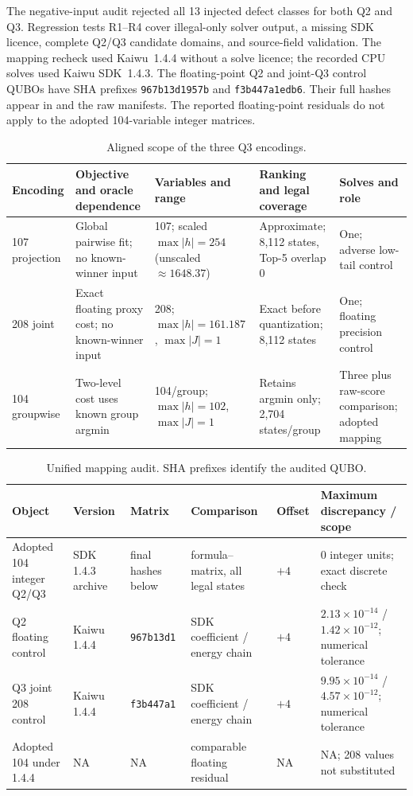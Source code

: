 The negative-input audit rejected all 13 injected defect classes for
both Q2 and Q3.  Regression tests R1--R4 cover illegal-only solver output,
a missing SDK licence, complete Q2/Q3 candidate domains, and source-field
validation.  The mapping recheck used Kaiwu~1.4.4 without a solve licence;
the recorded CPU solves used Kaiwu SDK~1.4.3.  The floating-point Q2 and
joint-Q3 control QUBOs have SHA prefixes
\texttt{967b13d1957b} and \texttt{f3b447a1edb6}.  Their full hashes appear
in  and the raw manifests.  The
reported floating-point residuals do not apply to the adopted
104-variable integer matrices.

\begin{table}[!htbp]
\centering
\caption{Aligned scope of the three Q3 encodings.}
\label{tab:q3-encoding-comparison}
\scriptsize
\begin{tabularx}{\textwidth}{@{}lXXXX@{}}
\toprule
Encoding & Objective and oracle dependence & Variables and range & Ranking and legal coverage & Solves and role \\
\midrule
107 projection & Global pairwise fit; no known-winner input & 107; scaled $\max|h|=254$ (unscaled $\approx1648.37$) & Approximate; 8,112 states, Top-5 overlap 0 & One; adverse low-tail control \\
208 joint & Exact floating proxy cost; no known-winner input & 208; $\max|h|=161.187$, $\max|J|=1$ & Exact before quantization; 8,112 states & One; floating precision control \\
104 groupwise & Two-level cost uses known group argmin & 104/group; $\max|h|=102$, $\max|J|=1$ & Retains argmin only; 2,704 states/group & Three plus raw-score comparison; adopted mapping \\
\bottomrule
\end{tabularx}
\end{table}

\begin{table}[!htbp]
\centering
\caption{Unified mapping audit.  SHA prefixes identify the audited QUBO.}
\label{tab:mapping-audit}
\scriptsize
\begin{tabularx}{\textwidth}{@{}lXXXXX@{}}
\toprule
Object & Version & Matrix & Comparison & Offset & Maximum discrepancy / scope \\
\midrule
Adopted 104 integer Q2/Q3 & SDK 1.4.3 archive & final hashes below & formula--matrix, all legal states & $+4$ & 0 integer units; exact discrete check \\
Q2 floating control & Kaiwu 1.4.4 & \texttt{967b13d1} & SDK coefficient / energy chain & $+4$ & $2.13\times10^{-14}$ / $1.42\times10^{-12}$; numerical tolerance \\
Q3 joint 208 control & Kaiwu 1.4.4 & \texttt{f3b447a1} & SDK coefficient / energy chain & $+4$ & $9.95\times10^{-14}$ / $4.57\times10^{-12}$; numerical tolerance \\
Adopted 104 under 1.4.4 & NA & NA & comparable floating residual & NA & NA; 208 values not substituted \\
\bottomrule
\end{tabularx}
\end{table}

